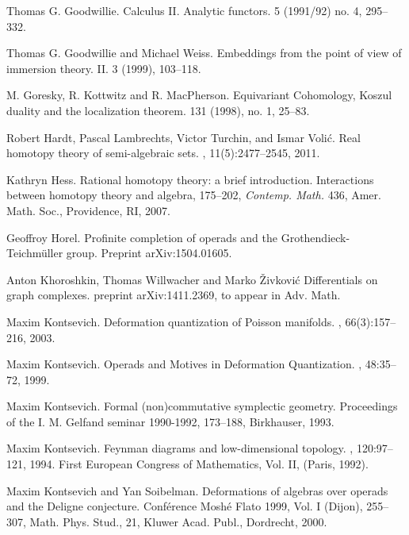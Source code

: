 \documentclass[a4paper]{amsart}
\theoremstyle{plain}
\theoremstyle{definition}
\begin{document}
\begin{thebibliography}{1}
Thomas G. Goodwillie.
\newblock Calculus II. Analytic functors.
 5 (1991/92) no. 4, 295--332.

Thomas G. Goodwillie and Michael Weiss.
\newblock Embeddings from the point of view of immersion theory. {II}.
 3 (1999), 103--118.

M. Goresky, R. Kottwitz and R. MacPherson.
\newblock Equivariant Cohomology, Koszul duality
and the localization theorem.
131
(1998), no. 1, 25--83.

Robert Hardt, Pascal Lambrechts, Victor Turchin, and Ismar Voli{\'c}.
\newblock Real homotopy theory of semi-algebraic sets.
, 11(5):2477--2545, 2011.

Kathryn Hess.
\newblock Rational homotopy theory: a brief introduction.
\newblock Interactions between homotopy theory and algebra, 175--202, {\em Contemp. Math.}  436, Amer. Math. Soc., Providence, RI, 2007.

Geoffroy Horel.
\newblock Profinite completion of operads and the Grothendieck-Teichm\"uller group.
\newblock Preprint arXiv:1504.01605.

Anton Khoroshkin, Thomas Willwacher and Marko \v Zivkovi\'c
\newblock Differentials on graph complexes.
\newblock preprint arXiv:1411.2369, to appear in Adv. Math.

Maxim Kontsevich.
\newblock Deformation quantization of Poisson manifolds.
, 66(3):157–216, 2003.

Maxim Kontsevich.
\newblock Operads and {M}otives in {D}eformation {Q}uantization.
, 48:35--72, 1999.

Maxim Kontsevich.
\newblock Formal (non)commutative symplectic geometry.
\newblock Proceedings of the I. M. Gelfand seminar 1990-1992, 173--188, Birkhauser, 1993.

Maxim Kontsevich.
\newblock Feynman diagrams and low-dimensional topology.
, 120:97--121, 1994.
\newblock First European Congress of Mathematics, Vol. II, (Paris, 1992).

Maxim Kontsevich and Yan Soibelman.
\newblock Deformations of algebras over operads and the Deligne conjecture.
\newblock Conf\'erence Mosh\'e Flato 1999, Vol. I (Dijon), 255--307,
Math. Phys. Stud., 21, Kluwer Acad. Publ., Dordrecht, 2000. 


\end{thebibliography}
\end{document}
